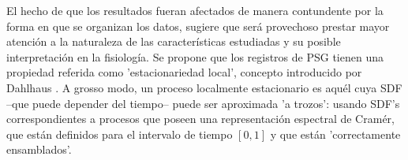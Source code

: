\documentclass[12pt,a4paper]{mitthesis}
\newtheorem{defn}{Definici\'on}
\newcommand{\intPI}{\int_{-\pi}^{\pi}}
\newcommand{\Cov}[1]{\mathrm{Cov}\left( #1 \right)}
\newcommand{\abso}[1]{\left| #1 \right|}
\begin{document}
El hecho de que los resultados fueran afectados de manera contundente por la forma en que se 
organizan los datos, sugiere que ser\'a provechoso prestar mayor atenci\'on a la naturaleza de las 
caracter\'isticas estudiadas y su posible interpretaci\'on en la fisiolog\'ia.
Se propone que los registros de PSG tienen una propiedad referida como 'estacionariedad local',
concepto introducido por Dahlhaus \cite{Dahlhaus97}.
A grosso modo, un proceso localmente estacionario es aqu\'el cuya SDF --que puede depender del 
tiempo-- puede ser aproximada 'a trozos': usando SDF's correspondientes a procesos que poseen una 
representaci\'on espectral de Cram\'er, que est\'an definidos para el intervalo de tiempo $[0,1]$ 
y que est\'an 'correctamente ensamblados'.

\end{document}
